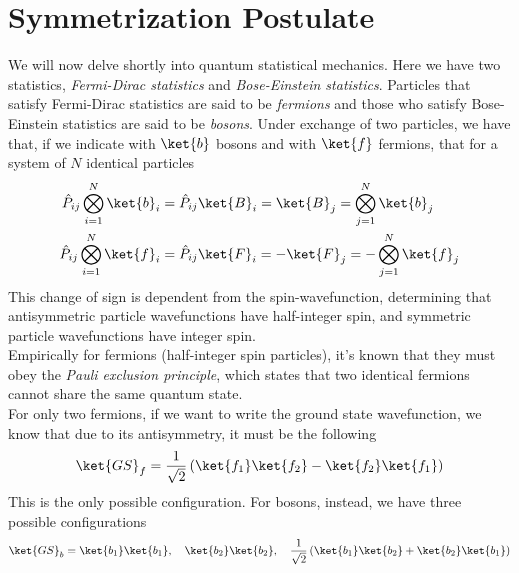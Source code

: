 \documentclass[a4paper, 11pt]{book}
\newcommand{\1}{\opr{\mathds{1}}}
\newcommand{\opr}[1]{\hat{#1}}
\theoremstyle{plain}
\begin{document}
	\section{Symmetrization Postulate}
	We will now delve shortly into quantum statistical mechanics. Here we have two statistics, \textit{Fermi-Dirac statistics} and \textit{Bose-Einstein statistics}. Particles that satisfy Fermi-Dirac statistics are said to be \textit{fermions} and those who satisfy Bose-Einstein statistics are said to be \textit{bosons}. Under exchange of two particles, we have that, if we indicate with $\ket{b}$ bosons and with $\ket{f}$ fermions, that for a system of $N$ identical particles
	\begin{equation}
		\begin{aligned}
			\opr{P}_{ij}\bigotimes_{i=1}^N\ket{b}_i&=\opr{P}_{ij}\ket{B}_{i}=\ket{B}_j=\bigotimes_{j=1}^N\ket{b}_j\\
			\opr{P}_{ij}\bigotimes_{i=1}^N\ket{f}_i&=\opr{P}_{ij}\ket{F}_i=-\ket{F}_j=-\bigotimes_{j=1}^N\ket{f}_j
		\end{aligned}
		\label{eq:bosonfermionexchange}
	\end{equation}
	This change of sign is dependent from the spin-wavefunction, determining that antisymmetric particle wavefunctions have half-integer spin, and symmetric particle wavefunctions have integer spin.\\
	Empirically for fermions (half-integer spin particles), it's known that they must obey the \textit{Pauli exclusion principle}, which states that two identical fermions cannot share the same quantum state.\\
	For only two fermions, if we want to write the ground state wavefunction, we know that due to its antisymmetry, it must be the following
	\begin{equation}
		\ket{GS}_f=\frac{1}{\sqrt{2}}\left( \ket{f_1}\ket{f_2}-\ket{f_2}\ket{f_1} \right)
		\label{eq:fermiongswave}
	\end{equation}
	This is the only possible configuration. For bosons, instead, we have three possible configurations
	\begin{equation}
		\ket{GS}_b=\ket{b_1}\ket{b_1},\quad\ket{b_2}\ket{b_2},\quad\frac{1}{\sqrt{2}}\left( \ket{b_1}\ket{b_2}+\ket{b_2}\ket{b_1} \right)
		\label{eq:bosongswave}
	\end{equation}
\end{document}
